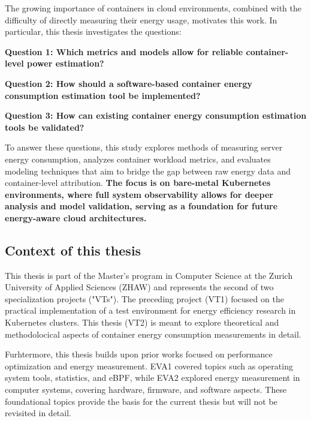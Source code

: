 The growing importance of containers in cloud environments, combined with the difficulty of directly measuring their energy usage, motivates this work. In particular, this thesis investigates the questions:

\textbf{Question 1: Which metrics and models allow for reliable container-level power estimation?}

\textbf{Question 2: How should a software-based container energy consumption estimation tool be implemented?}

\textbf{Question 3: How can existing container energy consumption estimation tools be validated?}

To answer these questions, this study explores methods of measuring server energy consumption, analyzes container workload metrics, and evaluates modeling techniques that aim to bridge the gap between raw energy data and container-level attribution. \textbf{The focus is on bare-metal Kubernetes environments, where full system observability allows for deeper analysis and model validation, serving as a foundation for future energy-aware cloud architectures.} 

\subsection{Context of this thesis}

This thesis is part of the Master's program in Computer Science at the Zurich University of Applied Sciences (ZHAW) and represents the second of two specialization projects ("VTs"). The preceding project (VT1) focused on the practical implementation of a test environment for energy efficiency research in Kubernetes clusters. This thesis (VT2) is meant to explore theoretical and methodolocical aspects of container energy consumption measurements in detail.

Furhtermore, this thesis builds upon prior works focused on performance optimization and energy measurement. EVA1 covered topics such as operating system tools, statistics, and eBPF, while EVA2 explored energy measurement in computer systems, covering hardware, firmware, and software aspects. These foundational topics provide the basis for the current thesis but will not be revisited in detail.


